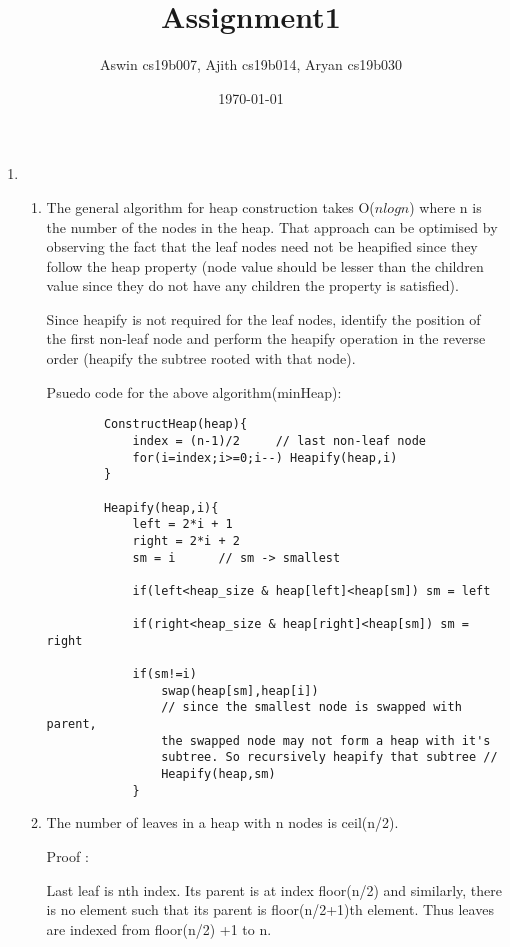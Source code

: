 \documentclass[12pt]{article}
\title{Assignment1}
\author{Aswin cs19b007, Ajith cs19b014, Aryan cs19b030}
\date{\today}
\begin{document}
\maketitle

\newpage
\begin{enumerate}
    \item\begin{enumerate}
        \item The general algorithm for heap construction takes O($nlogn$) where n is the number of the nodes in the heap. That approach can be optimised by observing the fact that the leaf nodes need not be  heapified since they follow the heap property (node value should be lesser than the children value since they do not have any children the property is satisfied). 
        
        Since heapify is not required for the leaf nodes, identify the position of the first non-leaf node and perform the heapify operation in the reverse order (heapify the subtree rooted with that node). 
        
        Psuedo code for the above algorithm(minHeap):
        \begin{verbatim}
        ConstructHeap(heap){
            index = (n-1)/2     // last non-leaf node
            for(i=index;i>=0;i--) Heapify(heap,i)
        }
        
        Heapify(heap,i){
            left = 2*i + 1
            right = 2*i + 2
            sm = i      // sm -> smallest
            
            if(left<heap_size & heap[left]<heap[sm]) sm = left 
            
            if(right<heap_size & heap[right]<heap[sm]) sm = right 
            
            if(sm!=i) 
                swap(heap[sm],heap[i])
                // since the smallest node is swapped with parent, 
                the swapped node may not form a heap with it's 
                subtree. So recursively heapify that subtree //
                Heapify(heap,sm) 
            }
        \end{verbatim}
        
        \item The number of leaves in a heap with n nodes is ceil(n/2).
        
        Proof : 
        
        Last leaf is nth index. Its parent is at index floor(n/2) and similarly,
        there is no element such that its parent is floor(n/2+1)th element.
        Thus leaves are indexed from floor(n/2) +1 to n.


\end{enumerate}
\end{enumerate}
\end{document}
